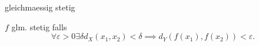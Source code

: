 \documentclass[class=article, crop=false]{standalone}
\begin{document}
\begin{zettel}{gleichmaessig stetig}
\begin{flashcard}[]{}
	\begin{definition}
		$f$ glm. stetig falls
		\[
			\forall \varepsilon > 0 \exists \delta d_X (x_1,x_2) < \delta \implies  d_Y (f (x_1 ), f(x_2 )) < \varepsilon
		.\]
	\end{definition}
\end{flashcard}
\end{zettel}
\end{document}
